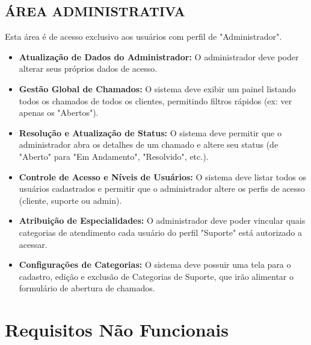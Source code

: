 \documentclass[a4paper, 12pt]{article}
\begin{document}
\subsection{ÁREA ADMINISTRATIVA}
Esta área é de acesso exclusivo aos usuários com perfil de "Administrador".
\begin{itemize}
        \item \textbf{Atualização de Dados do Administrador:} O administrador deve poder alterar seus próprios dados de acesso.
        \item \textbf{Gestão Global de Chamados:} O sistema deve exibir um painel listando todos os chamados de todos os clientes, permitindo filtros rápidos (ex: ver apenas os "Abertos").
        \item \textbf{Resolução e Atualização de Status:}  O sistema deve permitir que o administrador abra os detalhes de um chamado e altere seu status (de "Aberto" para "Em Andamento", "Resolvido", etc.).
        \item \textbf{Controle de Acesso e Níveis de Usuários:}  O sistema deve listar todos os usuários cadastrados e permitir que o administrador altere os perfis de acesso (cliente, suporte ou admin).
        \item \textbf{Atribuição de Especialidades:} O administrador deve poder vincular quais categorias de atendimento cada usuário do perfil "Suporte" está autorizado a acessar.
        \item \textbf{Configurações de Categorias:} O sistema deve possuir uma tela para o cadastro, edição e exclusão de Categorias de Suporte, que irão alimentar o formulário de abertura de chamados.
    \end{itemize}

\newpage
\section{Requisitos Não Funcionais}
\end{document}
